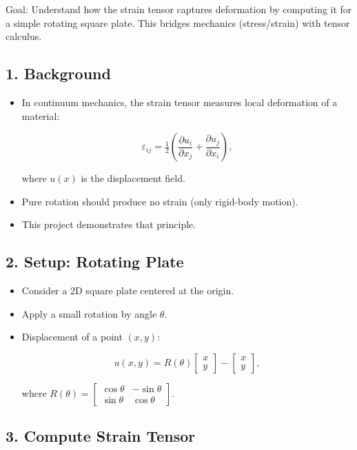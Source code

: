 \documentclass[
  letterpaper,
  DIV=11,
  numbers=noendperiod]{scrreprt}
\begin{document}
Goal: Understand how the strain tensor captures deformation by computing
it for a simple rotating square plate. This bridges mechanics
(stress/strain) with tensor calculus.

\subsection{1. Background}\label{background-2}

\begin{itemize}
\item
  In continuum mechanics, the strain tensor measures local deformation
  of a material:

  \[
  \varepsilon_{ij} = \tfrac{1}{2}\left(\frac{\partial u_i}{\partial x_j} + \frac{\partial u_j}{\partial x_i}\right),
  \]

  where \(u(x)\) is the displacement field.
\item
  Pure rotation should produce no strain (only rigid-body motion).
\item
  This project demonstrates that principle.
\end{itemize}

\subsection{2. Setup: Rotating Plate}\label{setup-rotating-plate}

\begin{itemize}
\item
  Consider a 2D square plate centered at the origin.
\item
  Apply a small rotation by angle \(\theta\).
\item
  Displacement of a point \((x,y)\):

  \[
  u(x,y) = R(\theta)\begin{bmatrix} x \\ y \end{bmatrix} - \begin{bmatrix} x \\ y \end{bmatrix},
  \]

  where
  \(R(\theta) = \begin{bmatrix} \cos\theta & -\sin\theta \\ \sin\theta & \cos\theta \end{bmatrix}\).
\end{itemize}

\subsection{3. Compute Strain Tensor}\label{compute-strain-tensor}
\end{document}
